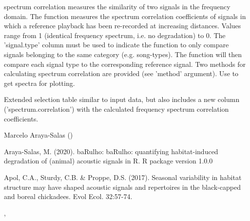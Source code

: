 \documentclass[letterpaper]{book}
\begin{document}
%
\begin{Details}\relax
spectrum correlation measures the similarity of two signals in the frequency domain. The function measures the spectrum correlation coefficients of signals in which a reference playback has been re-recorded at increasing distances. Values range from 1 (identical frequency spectrum, i.e. no degradation) to 0. The 'signal.type' column must be used to indicate the function to only compare signals belonging to the same category (e.g. song-types). The function will then compare each signal type to the corresponding reference signal. Two methods for calculating spectrum correlation are provided (see 'method' argument). Use  to get spectra for plotting.
\end{Details}
%
\begin{Value}
Extended selection table similar to input data, but also includes a new column ('spectrum.correlation')
with the calculated frequency spectrum correlation coefficients.
\end{Value}
%
\begin{Author}\relax
Marcelo Araya-Salas ()
\end{Author}
%
\begin{References}\relax

Araya-Salas, M. (2020). baRulho: baRulho: quantifying habitat-induced degradation of (animal) acoustic signals in R. R package version 1.0.0

Apol, C.A., Sturdy, C.B. \& Proppe, D.S. (2017). Seasonal variability in habitat structure may have shaped acoustic signals and repertoires in the black-capped and boreal chickadees. Evol Ecol. 32:57-74.

\end{References}
%
\begin{SeeAlso}\relax
{}, 
\end{SeeAlso}
%
\begin{Examples}
\end{Examples}
\printindex{}
\end{document}
